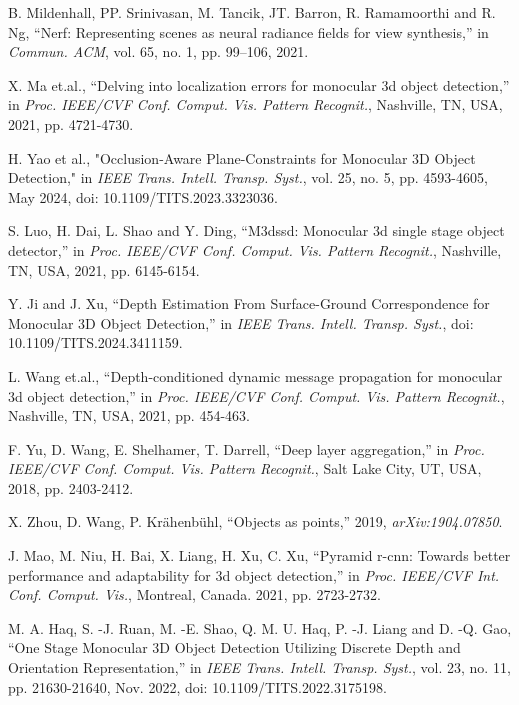 \documentclass[journal]{IEEEtran}
\begin{document}
\begin{thebibliography}{1}
		
		B. Mildenhall, PP. Srinivasan, M. Tancik, JT. Barron, R. Ramamoorthi and R. Ng, “Nerf: Representing scenes as neural radiance fields for view synthesis,” in \textit{Commun. ACM}, vol. 65, no. 1, pp. 99–106, 2021.
		
		X. Ma et.al., “Delving into localization errors for monocular 3d object detection,” in \textit{Proc. IEEE/CVF Conf. Comput. Vis. Pattern Recognit.}, Nashville, TN, USA, 2021, pp. 4721-4730.
		
		H. Yao et al., "Occlusion-Aware Plane-Constraints for Monocular 3D Object Detection," in \textit{IEEE Trans. Intell. Transp. Syst.}, vol. 25, no. 5, pp. 4593-4605, May 2024, doi: 10.1109/TITS.2023.3323036.
		
		S. Luo, H. Dai, L. Shao and Y. Ding, “M3dssd: Monocular 3d single stage object detector,” in \textit{Proc. IEEE/CVF Conf. Comput. Vis. Pattern Recognit.}, Nashville, TN, USA, 2021, pp. 6145-6154.
		
		Y. Ji and J. Xu, “Depth Estimation From Surface-Ground Correspondence for Monocular 3D Object Detection,” in \textit{IEEE Trans. Intell. Transp. Syst.}, doi: 10.1109/TITS.2024.3411159.
		
		L. Wang et.al., “Depth-conditioned dynamic message propagation for monocular 3d object detection,” in \textit{Proc. IEEE/CVF Conf. Comput. Vis. Pattern Recognit.}, Nashville, TN, USA, 2021, pp. 454-463.
		
		F. Yu, D. Wang, E. Shelhamer, T. Darrell, “Deep layer aggregation,” in \textit{Proc. IEEE/CVF Conf. Comput. Vis. Pattern Recognit.}, Salt Lake City, UT, USA, 2018, pp.  2403-2412.
		
		X. Zhou, D. Wang, P. Krähenbühl, “Objects as points,” 2019, \textit{arXiv:1904.07850}.
		
		J. Mao, M. Niu, H. Bai, X. Liang, H. Xu, C. Xu, “Pyramid r-cnn: Towards better performance and adaptability for 3d object detection,” in \textit{Proc. IEEE/CVF Int. Conf. Comput. Vis.}, Montreal, Canada. 2021, pp. 2723-2732. 
		
		M. A. Haq, S. -J. Ruan, M. -E. Shao, Q. M. U. Haq, P. -J. Liang and D. -Q. Gao, “One Stage Monocular 3D Object Detection Utilizing Discrete Depth and Orientation Representation,”  in \textit{IEEE Trans. Intell. Transp. Syst.}, vol. 23, no. 11, pp. 21630-21640, Nov. 2022, doi: 10.1109/TITS.2022.3175198.
		

\end{thebibliography}
\end{document}
